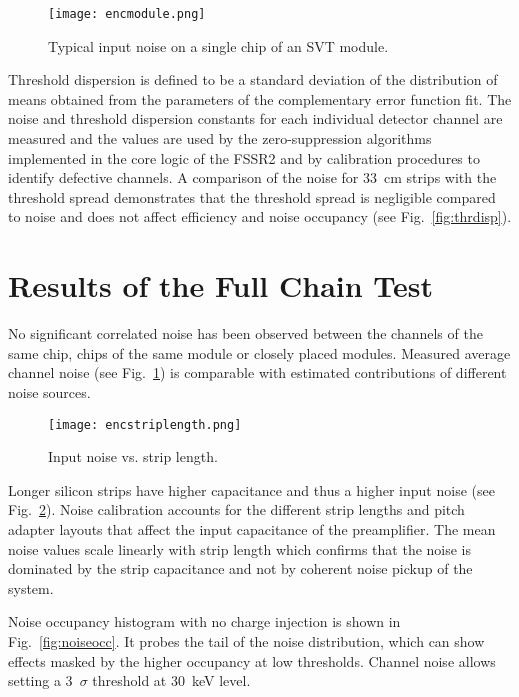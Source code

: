 \begin{figure}[hbt] 
	\centering 
	\texttt{[image: encmodule.png]}
	\caption{Typical input noise on a single chip of an SVT module.}
	\label{fig:encmodule}
\end{figure}

Threshold dispersion is defined to be a standard deviation of the distribution of means obtained from the parameters of the complementary error function fit. The noise and threshold dispersion constants for each individual detector channel are measured and the values are used by the zero-suppression algorithms implemented in the core logic of the FSSR2 and by calibration procedures to identify defective channels. A comparison of the noise for 33~cm strips with the threshold spread demonstrates that the threshold spread is negligible compared to noise and does not affect efficiency and noise occupancy (see Fig.~\ref{fig:thrdisp}).

\section{Results of the Full Chain Test}

No significant correlated noise has been observed between the channels of the same chip, chips of the same module or closely placed modules. Measured average channel noise (see Fig.~\ref{fig:encmodule}) is comparable with estimated contributions of different noise sources. 

\begin{figure}[hbt] 
	\centering 
	\texttt{[image: encstriplength.png]}
	\caption{Input noise vs. strip length.}
	\label{fig:encstriplength}
\end{figure}

Longer silicon strips have higher capacitance and thus a higher input noise (see Fig.~\ref{fig:encstriplength}). Noise calibration accounts for the different strip lengths and pitch adapter layouts that affect the input capacitance of the preamplifier. The mean noise values scale linearly with strip length which confirms that the noise is dominated by the strip capacitance and not by coherent noise pickup of the system. 

Noise occupancy histogram with no charge injection is shown in Fig.~\ref{fig:noiseocc}. It probes the tail of the noise distribution, which can show effects masked by the higher occupancy at low thresholds. Channel noise allows setting a 3~$\sigma$ threshold at 30~keV level. 

